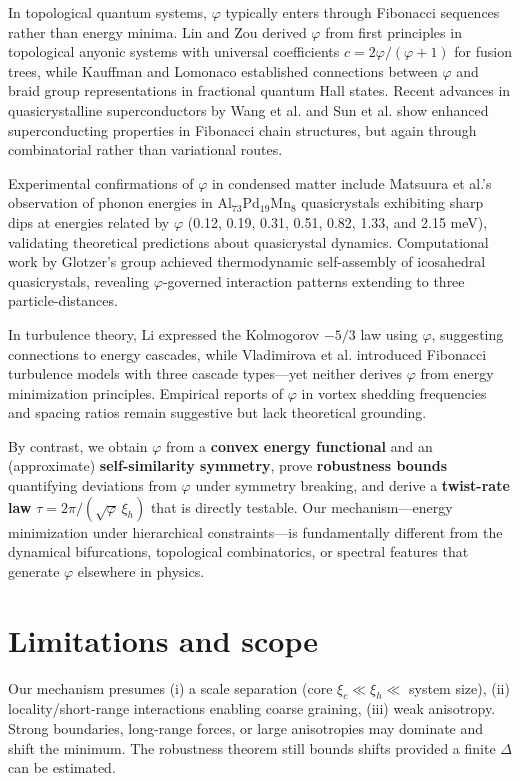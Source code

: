 \documentclass[11pt]{article}
\theoremstyle{remark}
\theoremstyle{definition}
\newcommand{\ph}{\varphi}
\begin{document}
In topological quantum systems, $\ph$ typically enters through Fibonacci sequences rather than energy minima. Lin and Zou \cite{lin2021} derived $\ph$ from first principles in topological anyonic systems with universal coefficients $c=2\ph/(\ph+1)$ for fusion trees, while Kauffman and Lomonaco \cite{kauffman2004} established connections between $\ph$ and braid group representations in fractional quantum Hall states. Recent advances in quasicrystalline superconductors by Wang et al. \cite{wang2024} and Sun et al. \cite{sun2023} show enhanced superconducting properties in Fibonacci chain structures, but again through combinatorial rather than variational routes.

Experimental confirmations of $\ph$ in condensed matter include Matsuura et al.'s \cite{matsuura2024} observation of phonon energies in Al$_{73}$Pd$_{19}$Mn$_8$ quasicrystals exhibiting sharp dips at energies related by $\ph$ (0.12, 0.19, 0.31, 0.51, 0.82, 1.33, and 2.15 meV), validating theoretical predictions about quasicrystal dynamics. Computational work by Glotzer's group \cite{glotzer2015} achieved thermodynamic self-assembly of icosahedral quasicrystals, revealing $\ph$-governed interaction patterns extending to three particle-distances.

In turbulence theory, Li \cite{li2013} expressed the Kolmogorov $-5/3$ law using $\ph$, suggesting connections to energy cascades, while Vladimirova et al. \cite{vladimirova2021} introduced Fibonacci turbulence models with three cascade types---yet neither derives $\ph$ from energy minimization principles. Empirical reports of $\ph$ in vortex shedding frequencies \cite{schewe1983} and spacing ratios remain suggestive but lack theoretical grounding.

By contrast, we obtain $\ph$ from a \textbf{convex energy functional} and an (approximate) \textbf{self-similarity symmetry}, prove \textbf{robustness bounds} quantifying deviations from $\ph$ under symmetry breaking, and derive a \textbf{twist-rate law} $\tau=2\pi/(\sqrt{\ph}\,\xi_h)$ that is directly testable. Our mechanism---energy minimization under hierarchical constraints---is fundamentally different from the dynamical bifurcations, topological combinatorics, or spectral features that generate $\ph$ elsewhere in physics.

\section{Limitations and scope}
Our mechanism presumes (i) a scale separation (core $\xi_c\ll\xi_h\ll$ system size), (ii) locality/short-range interactions enabling coarse graining, (iii) weak anisotropy. Strong boundaries, long-range forces, or large anisotropies may dominate and shift the minimum. The robustness theorem still bounds shifts provided a finite $\Delta$ can be estimated.
\end{document}
